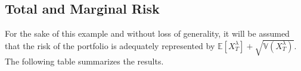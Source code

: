 \documentclass[12pt]{article}
\theoremstyle{definition}
\begin{document}



\subsection{Total and Marginal Risk}

 For the sake of this example and without loss of generality, it will be assumed that the risk of the portfolio is adequately represented by \(\mathbb{E}[X_T^\lambda]+\sqrt{\mathbb{V}(X_T^\lambda)}\).  The following table summarizes the results.
\end{document}

